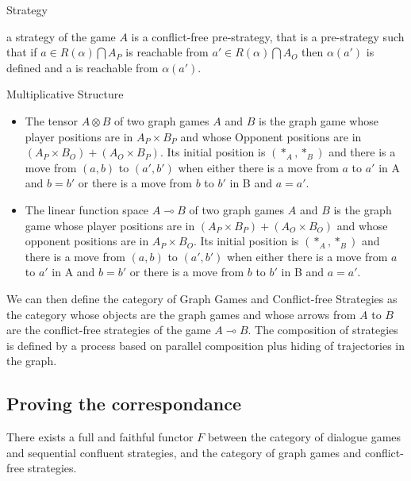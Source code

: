 \documentclass[a4paper,UKenglish]{lipics}
\begin{document}
\begin{definition}{Strategy}

a strategy of the game $A$ is a conflict-free pre-strategy, that is a pre-strategy such that if $a \in R(\alpha)\bigcap A_P$ is reachable from $a' \in R(\alpha)\bigcap A_O$ then $\alpha (a')$ is defined and a is reachable from $\alpha(a')$. 
\end{definition}

\begin{definition}{Multiplicative Structure}
\begin{itemize}
\item The tensor $A\otimes B$ of two graph games $A$ and $B$ is the graph game whose player positions are in $A_P \times B_P$ and whose Opponent positions are in $(A_P \times B_O) + (A_O \times B_P)$. Its initial position is $ (*_A, *_B)$ and there is a move from $(a,b)$ to $(a',b')$ when either there is a move from $a$ to $a'$ in A and $b=b'$ or there is a move from $b$ to $b'$ in B and $a=a'$.\\
\item The linear function space $A \multimap B$ of two graph games $A$ and $B$ is the graph game whose player positions are in $(A_P \times B_P) + (A_O \times B_O)$ and whose opponent positions are in $A_P \times B_O$. Its initial position is $ (*_A, *_B)$ and there is a move from $(a,b)$ to $(a',b')$ when either there is a move from $a$ to $a'$ in A and $b=b'$ or there is a move from $b$ to $b'$ in B and $a=a'$.\\
\end{itemize}
\end{definition}

We can then define the category of Graph Games and Conflict-free Strategies as the category whose objects are the graph games and whose arrows from $A$ to $B$ are the conflict-free strategies of the game $A\multimap B$. The composition of strategies is defined by a process based on parallel composition plus hiding of trajectories in the graph.
  
\subsection{Proving the correspondance}
\begin{theorem}
There exists a full and faithful functor $F$ between the category of dialogue games and sequential confluent strategies, and the category of graph games and conflict-free strategies.
\end{theorem} 
\end{document}
